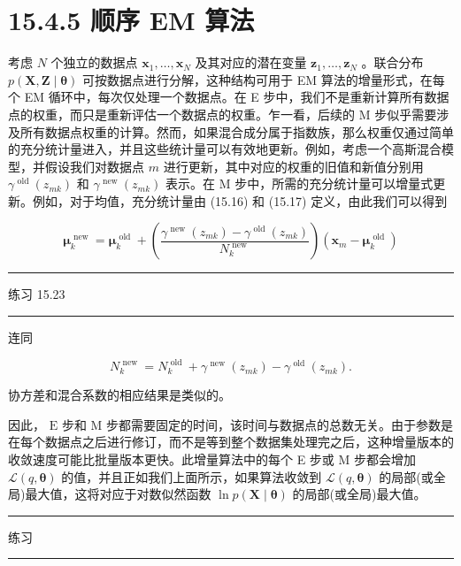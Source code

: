 \documentclass[10pt]{report}
\newcommand{\HRule}{\begin{center}\rule{0.9\linewidth}{0.2mm}\end{center}}
\begin{document}
\section*{15.4.5 顺序 EM 算法}

考虑 \(N\) 个独立的数据点 \({\mathbf{x}}_{1},\ldots ,{\mathbf{x}}_{N}\) 及其对应的潜在变量 \({\mathbf{z}}_{1},\ldots ,{\mathbf{z}}_{N}\) 。联合分布 \(p\left( {\mathbf{X},\mathbf{Z} \mid  \mathbf{\theta }}\right)\) 可按数据点进行分解，这种结构可用于 EM 算法的增量形式，在每个 EM 循环中，每次仅处理一个数据点。在 E 步中，我们不是重新计算所有数据点的权重，而只是重新评估一个数据点的权重。乍一看，后续的 M 步似乎需要涉及所有数据点权重的计算。然而，如果混合成分属于指数族，那么权重仅通过简单的充分统计量进入，并且这些统计量可以有效地更新。例如，考虑一个高斯混合模型，并假设我们对数据点 \(m\) 进行更新，其中对应的权重的旧值和新值分别用 \({\gamma }^{\text{ old }}\left( {z}_{mk}\right)\) 和 \({\gamma }^{\text{ new }}\left( {z}_{mk}\right)\) 表示。在 M 步中，所需的充分统计量可以增量式更新。例如，对于均值，充分统计量由 (15.16) 和 (15.17) 定义，由此我们可以得到

\[
{\mathbf{\mu }}_{k}^{\text{ new }} = {\mathbf{\mu }}_{k}^{\text{ old }} + \left( \frac{{\gamma }^{\text{ new }}\left( {z}_{mk}\right)  - {\gamma }^{\text{ old }}\left( {z}_{mk}\right) }{{N}_{k}^{\text{ new }}}\right) \left( {{\mathbf{x}}_{m} - {\mathbf{\mu }}_{k}^{\text{ old }}}\right)  \tag{15.60}
\]

\HRule

练习 15.23

\HRule

连同

\[
{N}_{k}^{\text{ new }} = {N}_{k}^{\text{ old }} + {\gamma }^{\text{ new }}\left( {z}_{mk}\right)  - {\gamma }^{\text{ old }}\left( {z}_{mk}\right) . \tag{15.61}
\]

协方差和混合系数的相应结果是类似的。

因此， \(\mathrm{E}\) 步和 \(\mathrm{M}\) 步都需要固定的时间，该时间与数据点的总数无关。由于参数是在每个数据点之后进行修订，而不是等到整个数据集处理完之后，这种增量版本的收敛速度可能比批量版本更快。此增量算法中的每个 E 步或 M 步都会增加 \(\mathcal{L}\left( {q,\mathbf{\theta }}\right)\) 的值，并且正如我们上面所示，如果算法收敛到 \(\mathcal{L}\left( {q,\mathbf{\theta }}\right)\) 的局部(或全局)最大值，这将对应于对数似然函数 \(\ln p\left( {\mathbf{X} \mid  \mathbf{\theta }}\right)\) 的局部(或全局)最大值。

\HRule

练习

\HRule
\end{document}
